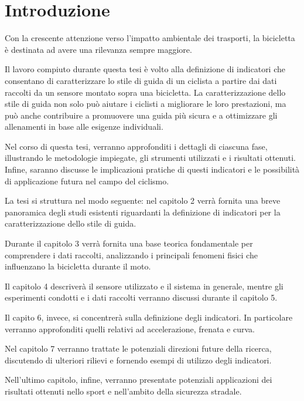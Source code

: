 \documentclass[class=article]{standalone}
\begin{document}
	\section{Introduzione}	
	Con la crescente attenzione verso l’impatto ambientale dei trasporti, la bicicletta è destinata ad avere una rilevanza sempre maggiore. 
	
	Il lavoro compiuto durante questa tesi è volto alla definizione di indicatori che consentano di caratterizzare lo stile di guida di un ciclista a partire dai dati raccolti da un sensore montato sopra una bicicletta. La caratterizzazione dello stile di guida non solo può aiutare i ciclisti a migliorare le loro prestazioni, ma può anche contribuire a promuovere una guida più sicura e a ottimizzare gli allenamenti in base alle esigenze individuali.
	
	Nel corso di questa tesi, verranno approfonditi i dettagli di ciascuna fase, illustrando le metodologie impiegate, gli strumenti utilizzati e i risultati ottenuti. Infine, saranno discusse le implicazioni pratiche di questi indicatori e le possibilità di applicazione futura nel campo del ciclismo.\hfill\break
	
	La tesi si struttura nel modo seguente: nel capitolo 2 verrà fornita una breve panoramica  degli studi esistenti riguardanti la definizione di indicatori per la caratterizzazione dello stile di guida.
	
	Durante il capitolo 3 verrà fornita una base teorica fondamentale per comprendere i dati raccolti, analizzando i principali fenomeni fisici che influenzano la bicicletta durante il moto.
	
	Il capitolo 4 descriverà il sensore utilizzato e il sistema in generale, mentre gli esperimenti condotti e i dati raccolti verranno discussi durante il capitolo 5.
	
	Il capito 6, invece, si concentrerà sulla definizione degli indicatori. In particolare verranno approfonditi quelli relativi ad accelerazione, frenata e curva.
	
	Nel capitolo 7 verranno trattate le potenziali direzioni future della ricerca, discutendo di ulteriori rilievi e fornendo esempi di utilizzo degli indicatori.
	
	Nell'ultimo capitolo, infine, verranno presentate potenziali applicazioni dei risultati ottenuti nello sport e nell'ambito della sicurezza stradale.
\end{document}
